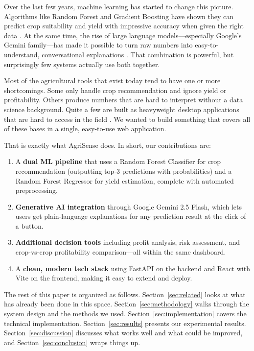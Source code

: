 \documentclass[conference]{IEEEtran}
\begin{document}
Over the last few years, machine learning has started to change this picture. Algorithms like Random Forest and Gradient Boosting have shown they can predict crop suitability and yield with impressive accuracy when given the right data \cite{kamilaris2018, chlingaryan2018}. At the same time, the rise of large language models---especially Google's Gemini family---has made it possible to turn raw numbers into easy-to-understand, conversational explanations \cite{brown2020}. That combination is powerful, but surprisingly few systems actually use both together.

Most of the agricultural tools that exist today tend to have one or more shortcomings. Some only handle crop recommendation and ignore yield or profitability. Others produce numbers that are hard to interpret without a data science background. Quite a few are built as heavyweight desktop applications that are hard to access in the field \cite{wolfert2017}. We wanted to build something that covers all of these bases in a single, easy-to-use web application.

That is exactly what AgriSense does. In short, our contributions are:

\begin{enumerate}
    \item A \textbf{dual ML pipeline} that uses a Random Forest Classifier for crop recommendation (outputting top-3 predictions with probabilities) and a Random Forest Regressor for yield estimation, complete with automated preprocessing.
    \item \textbf{Generative AI integration} through Google Gemini 2.5 Flash, which lets users get plain-language explanations for any prediction result at the click of a button.
    \item \textbf{Additional decision tools} including profit analysis, risk assessment, and crop-vs-crop profitability comparison---all within the same dashboard.
    \item A \textbf{clean, modern tech stack} using FastAPI on the backend and React with Vite on the frontend, making it easy to extend and deploy.
\end{enumerate}

The rest of this paper is organized as follows. Section~\ref{sec:related} looks at what has already been done in this space. Section~\ref{sec:methodology} walks through the system design and the methods we used. Section~\ref{sec:implementation} covers the technical implementation. Section~\ref{sec:results} presents our experimental results. Section~\ref{sec:discussion} discusses what works well and what could be improved, and Section~\ref{sec:conclusion} wraps things up.
\end{document}

